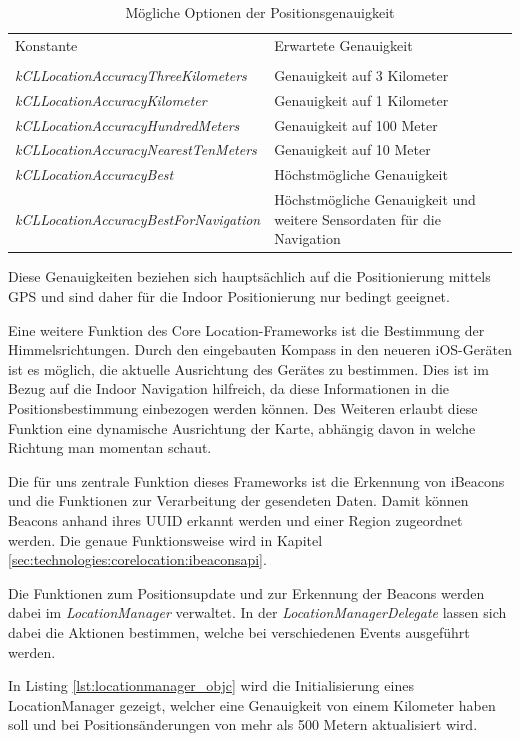     \begin{table}[htb!]
      \centering
      \begin{tabular}{l p{6cm}}
        Konstante & Erwartete Genauigkeit \\ \\
		\emph{kCLLocationAccuracyThreeKilometers} & Genauigkeit auf 3 Kilometer \\
		\emph{kCLLocationAccuracyKilometer} & Genauigkeit auf 1 Kilometer \\
		\emph{kCLLocationAccuracyHundredMeters} & Genauigkeit auf 100 Meter \\
		\emph{kCLLocationAccuracyNearestTenMeters} & Genauigkeit auf 10 Meter \\
		\emph{kCLLocationAccuracyBest} & Höchstmögliche Genauigkeit \\
		\emph{kCLLocationAccuracyBestForNavigation} & Höchstmögliche Genauigkeit und weitere Sensordaten für die Navigation
      \end{tabular}
      \caption{Mögliche Optionen der Positionsgenauigkeit}
      \label{tbl:positionaccuracy}
    \end{table}
	
Diese Genauigkeiten beziehen sich hauptsächlich auf die Positionierung mittels GPS und sind daher für die Indoor Positionierung nur bedingt geeignet.


Eine weitere Funktion des Core Location-Frameworks ist die Bestimmung der Himmelsrichtungen. Durch den eingebauten Kompass in den neueren iOS-Geräten ist es möglich, die aktuelle Ausrichtung des Gerätes zu bestimmen. Dies ist im Bezug auf die Indoor Navigation hilfreich, da diese Informationen in die Positionsbestimmung einbezogen werden können.
Des Weiteren erlaubt diese Funktion eine dynamische Ausrichtung der Karte, abhängig davon in welche Richtung man momentan schaut.


Die für uns zentrale Funktion dieses Frameworks ist die Erkennung von iBeacons und die Funktionen zur Verarbeitung der gesendeten Daten.
Damit können Beacons anhand ihres UUID erkannt werden und einer Region zugeordnet werden. Die genaue Funktionsweise wird in Kapitel \ref{sec:technologies:corelocation:ibeaconsapi}.

Die Funktionen zum Positionsupdate und zur Erkennung der Beacons werden dabei im \emph{LocationManager} verwaltet.
In der \emph{LocationManagerDelegate} lassen sich dabei die Aktionen bestimmen, welche bei verschiedenen Events ausgeführt werden.

In Listing \ref{lst:locationmanager_objc} wird die Initialisierung eines LocationManager gezeigt, welcher eine Genauigkeit von einem Kilometer haben soll und bei Positionsänderungen von mehr als 500 Metern aktualisiert wird.

